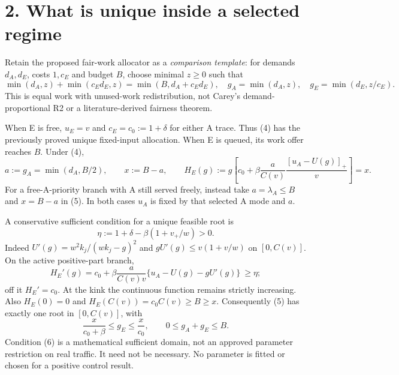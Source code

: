 \documentclass[11pt,a4paper]{article}
\newcommand{\pos}[1]{[#1]_+}
\begin{document}
\newpage
\section*{2. What is unique inside a selected regime}

Retain the proposed fair-work allocator as a \emph{comparison template}:
for demands $d_A,d_E$, costs $1,c_E$ and budget $B$, choose minimal $z\geq0$
such that
\begin{equation}
 \min(d_A,z)+\min(c_Ed_E,z)
   =\min(B,d_A+c_Ed_E),\quad
 g_A=\min(d_A,z),\quad g_E=\min(d_E,z/c_E). \tag{4}
\end{equation}
This is equal work with unused-work redistribution, not Carey's
demand-proportional R2 or a literature-derived fairness theorem.

When E is free, $u_E=v$ and $c_E=c_0:=1+\delta$ for either A trace.
Thus (4) has the previously proved unique fixed-input allocation.
When E is queued, its work offer reaches $B$. Under (4),
\begin{equation}
 a:=g_A=\min(d_A,B/2),\qquad x:=B-a,\qquad
 H_E(g):=g\!\left[c_0+\beta\frac a{C(v)}
                    \frac{\pos{u_A-U(g)}}v\right]=x. \tag{5}
\end{equation}
For a free-A-priority branch with A still served freely, instead take
$a=\lambda_A\leq B$ and $x=B-a$ in (5).
In both cases $u_A$ is fixed by that selected A mode and $a$.

A conservative sufficient condition for a unique feasible root is
\begin{equation}
 \eta:=1+\delta-\beta(1+v_+/w)>0. \tag{6}
\end{equation}
Indeed $U'(g)=w^2k_j/(wk_j-g)^2$ and
$gU'(g)\leq v(1+v/w)$ on $[0,C(v)]$. On the active positive-part branch,
\begin{equation}
 H_E'(g)=c_0+\beta\frac a{C(v)v}
                  \{u_A-U(g)-gU'(g)\}\ \geq\eta; \tag{7}
\end{equation}
off it $H_E'=c_0$. At the kink the continuous function remains strictly
increasing. Also $H_E(0)=0$ and $H_E(C(v))=c_0C(v)\geq B\geq x$.
Consequently (5) has exactly one root in $[0,C(v)]$, with
\begin{equation}
 \frac{x}{c_0+\beta}\leq g_E\leq\frac{x}{c_0},\qquad
 0\leq g_A+g_E\leq B. \tag{8}
\end{equation}
Condition (6) is a mathematical sufficient domain, not an approved
parameter restriction on real traffic. It need not be necessary.
No parameter is fitted or chosen for a positive control result.
\end{document}
